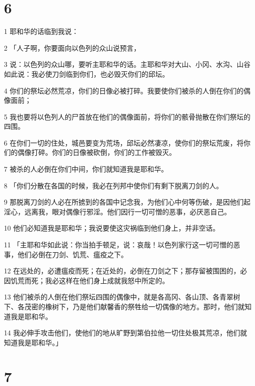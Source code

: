 \chapter{6}

\par 1 耶和华的话临到我说：
\par 2 「人子啊，你要面向以色列的众山说预言，
\par 3 说：以色列的众山哪，要听主耶和华的话。主耶和华对大山、小冈、水沟、山谷如此说：我必使刀剑临到你们，也必毁灭你们的邱坛。
\par 4 你们的祭坛必然荒凉，你们的日像必被打碎。我要使你们被杀的人倒在你们的偶像面前；
\par 5 我也要将以色列人的尸首放在他们的偶像面前，将你们的骸骨抛散在你们祭坛的四围。
\par 6 在你们一切的住处，城邑要变为荒场，邱坛必然凄凉，使你们的祭坛荒废，将你们的偶像打碎。你们的日像被砍倒，你们的工作被毁灭。
\par 7 被杀的人必倒在你们中间，你们就知道我是耶和华。
\par 8 「你们分散在各国的时候，我必在列邦中使你们有剩下脱离刀剑的人。
\par 9 那脱离刀剑的人必在所掳到的各国中记念我，为他们心中何等伤破，是因他们起淫心，远离我，眼对偶像行邪淫。他们因行一切可憎的恶事，必厌恶自己。
\par 10 他们必知道我是耶和华；我说要使这灾祸临到他们身上，并非空话。
\par 11 「主耶和华如此说：你当拍手顿足，说：哀哉！以色列家行这一切可憎的恶事，他们必倒在刀剑、饥荒、瘟疫之下。
\par 12 在远处的，必遭瘟疫而死；在近处的，必倒在刀剑之下；那存留被围困的，必因饥荒而死；我必这样在他们身上成就我怒中所定的。
\par 13 他们被杀的人倒在他们祭坛四围的偶像中，就是各高冈、各山顶、各青翠树下、各茂密的橡树下，乃是他们献馨香的祭牲给一切偶像的地方。那时，他们就知道我是耶和华。
\par 14 我必伸手攻击他们，使他们的地从旷野到第伯拉他一切住处极其荒凉，他们就知道我是耶和华。」

\chapter{7}

